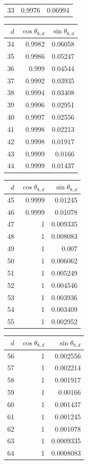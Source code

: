 {\begin{tabular}[t]{r|rr}
33 & 0.9976 & 0.06994
\end{tabular}\kern4pt
\begin{tabular}[t]{r|rr}
$d$ & $\cos\theta_{8,d}$ & $\sin\theta_{8,d}$ \\\hline
34 & 0.9982 & 0.06058 \\
35 & 0.9986 & 0.05247 \\
36 & 0.999 & 0.04544 \\
37 & 0.9992 & 0.03935 \\
38 & 0.9994 & 0.03408 \\
39 & 0.9996 & 0.02951 \\
40 & 0.9997 & 0.02556 \\
41 & 0.9998 & 0.02213 \\
42 & 0.9998 & 0.01917 \\
43 & 0.9999 & 0.0166 \\
44 & 0.9999 & 0.01437
\end{tabular}\kern4pt
\begin{tabular}[t]{r|rr}
$d$ & $\cos\theta_{8,d}$ & $\sin\theta_{8,d}$ \\\hline
45 & 0.9999 & 0.01245 \\
46 & 0.9999 & 0.01078 \\
47 & 1 & 0.009335 \\
48 & 1 & 0.008083 \\
49 & 1 & 0.007 \\
50 & 1 & 0.006062 \\
51 & 1 & 0.005249 \\
52 & 1 & 0.004546 \\
53 & 1 & 0.003936 \\
54 & 1 & 0.003409 \\
55 & 1 & 0.002952
\end{tabular}\kern4pt
\begin{tabular}[t]{r|rr}
$d$ & $\cos\theta_{8,d}$ & $\sin\theta_{8,d}$ \\\hline
56 & 1 & 0.002556 \\
57 & 1 & 0.002214 \\
58 & 1 & 0.001917 \\
59 & 1 & 0.00166 \\
60 & 1 & 0.001437 \\
61 & 1 & 0.001245 \\
62 & 1 & 0.001078 \\
63 & 1 & 0.0009335 \\
64 & 1 & 0.0008083
\end{tabular}}

